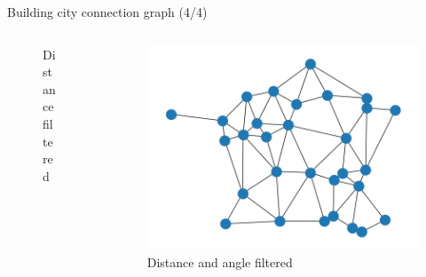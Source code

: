 \begin{frame}{Building city connection graph (4/4)}
\begin{columns}
\begin{column}{0.3\textwidth}
\begin{figure}
                \caption{Distance filtered}
            \end{figure}
        \end{column}
        \begin{column}{0.3\textwidth}
            \begin{figure}
                \includegraphics[width=0.2\paperwidth]{images/road_detection/delaunay_big_cities_distance_angle_filtered.png}
                \caption{Distance and angle filtered}
            \end{figure}
        \end{column}
    \end{columns}        
\end{frame}